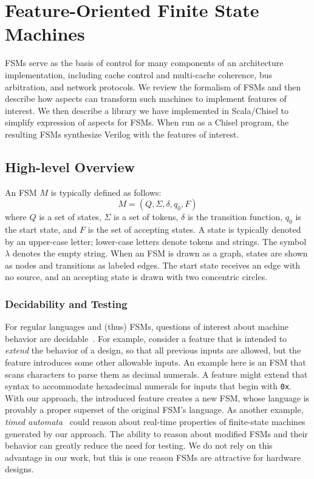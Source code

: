 \documentclass[conference]{IEEEtran}
\begin{document}
\section{Feature-Oriented Finite State Machines} \label{Sec:FSM}

FSMs serve as the basis of control for many components of an architecture implementation, including cache control and multi-cache coherence, bus arbitration, and network protocols.  We review the formalism of  FSMs and then describe how aspects can transform such machines to implement features of interest.  We then describe a library we have implemented in Scala/Chisel to simplify expression of aspects for FSMs.  When run as a Chisel program, the resulting FSMs synthesize Verilog with the features of interest.

\subsection{High-level Overview}
An FSM $M$ is typically defined as follows: 
\[M = (Q, \Sigma, \delta, q_0, F)\]where $Q$ is a set of states, $\Sigma$ is a set of tokens, $\delta$ is the transition function, $q_0$ is the start state, and $F$ is the set of accepting states.  A state is typically denoted by an upper-case letter;  lower-case letters denote tokens and strings.  The symbol $\lambda$ denotes the empty string.  When an FSM is drawn as a graph, states are shown as nodes and transitions as labeled edges.  The start state receives an edge with no source, and an accepting state is drawn with two concentric circles. 

\subsubsection{Decidability and Testing}
For regular languages and (thus) FSMs, questions of interest about machine behavior are decidable~\cite{sipser}.    For example, consider a feature that is intended to \emph{extend} the behavior of a design, so that all previous inputs are allowed, but the feature introduces some other allowable inputs.
An example here is an FSM that scans characters to parse them as decimal numerals.  A feature might extend that syntax to accommodate hexadecimal numerals for inputs that begin with \texttt{0x}.  With our approach, the introduced feature creates a new FSM, whose language is provably a proper superset of the original FSM's language.  As another example, \emph{timed automata}~\cite{10.1145/2518102} could reason about real-time properties of finite-state machines generated by our approach.  The ability to reason about modified FSMs and their behavior can greatly reduce the need for testing.  We do not rely on this advantage in our work, but this is one reason FSMs are attractive for hardware designs.
\end{document}
